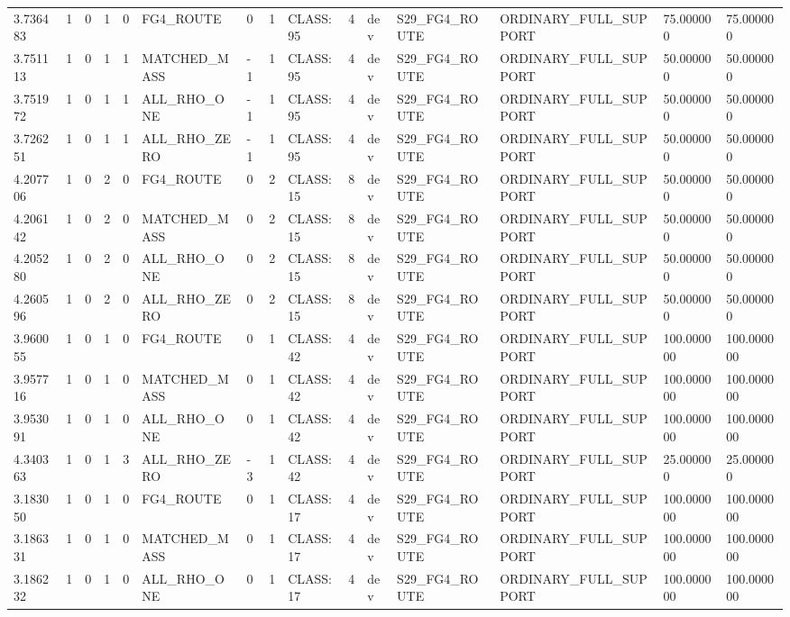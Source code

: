 \begin{tabular}{lllllllllllllll}
3.736483 & 1 & 0 & 1 & 0 & FG4\_ROUTE & 0 & 1 & CLASS:95 & 4 & dev & S29\_FG4\_ROUTE & ORDINARY\_FULL\_SUPPORT & 75.000000 & 75.000000 \\
3.751113 & 1 & 0 & 1 & 1 & MATCHED\_MASS & -1 & 1 & CLASS:95 & 4 & dev & S29\_FG4\_ROUTE & ORDINARY\_FULL\_SUPPORT & 50.000000 & 50.000000 \\
3.751972 & 1 & 0 & 1 & 1 & ALL\_RHO\_ONE & -1 & 1 & CLASS:95 & 4 & dev & S29\_FG4\_ROUTE & ORDINARY\_FULL\_SUPPORT & 50.000000 & 50.000000 \\
3.726251 & 1 & 0 & 1 & 1 & ALL\_RHO\_ZERO & -1 & 1 & CLASS:95 & 4 & dev & S29\_FG4\_ROUTE & ORDINARY\_FULL\_SUPPORT & 50.000000 & 50.000000 \\
4.207706 & 1 & 0 & 2 & 0 & FG4\_ROUTE & 0 & 2 & CLASS:15 & 8 & dev & S29\_FG4\_ROUTE & ORDINARY\_FULL\_SUPPORT & 50.000000 & 50.000000 \\
4.206142 & 1 & 0 & 2 & 0 & MATCHED\_MASS & 0 & 2 & CLASS:15 & 8 & dev & S29\_FG4\_ROUTE & ORDINARY\_FULL\_SUPPORT & 50.000000 & 50.000000 \\
4.205280 & 1 & 0 & 2 & 0 & ALL\_RHO\_ONE & 0 & 2 & CLASS:15 & 8 & dev & S29\_FG4\_ROUTE & ORDINARY\_FULL\_SUPPORT & 50.000000 & 50.000000 \\
4.260596 & 1 & 0 & 2 & 0 & ALL\_RHO\_ZERO & 0 & 2 & CLASS:15 & 8 & dev & S29\_FG4\_ROUTE & ORDINARY\_FULL\_SUPPORT & 50.000000 & 50.000000 \\
3.960055 & 1 & 0 & 1 & 0 & FG4\_ROUTE & 0 & 1 & CLASS:42 & 4 & dev & S29\_FG4\_ROUTE & ORDINARY\_FULL\_SUPPORT & 100.000000 & 100.000000 \\
3.957716 & 1 & 0 & 1 & 0 & MATCHED\_MASS & 0 & 1 & CLASS:42 & 4 & dev & S29\_FG4\_ROUTE & ORDINARY\_FULL\_SUPPORT & 100.000000 & 100.000000 \\
3.953091 & 1 & 0 & 1 & 0 & ALL\_RHO\_ONE & 0 & 1 & CLASS:42 & 4 & dev & S29\_FG4\_ROUTE & ORDINARY\_FULL\_SUPPORT & 100.000000 & 100.000000 \\
4.340363 & 1 & 0 & 1 & 3 & ALL\_RHO\_ZERO & -3 & 1 & CLASS:42 & 4 & dev & S29\_FG4\_ROUTE & ORDINARY\_FULL\_SUPPORT & 25.000000 & 25.000000 \\
3.183050 & 1 & 0 & 1 & 0 & FG4\_ROUTE & 0 & 1 & CLASS:17 & 4 & dev & S29\_FG4\_ROUTE & ORDINARY\_FULL\_SUPPORT & 100.000000 & 100.000000 \\
3.186331 & 1 & 0 & 1 & 0 & MATCHED\_MASS & 0 & 1 & CLASS:17 & 4 & dev & S29\_FG4\_ROUTE & ORDINARY\_FULL\_SUPPORT & 100.000000 & 100.000000 \\
3.186232 & 1 & 0 & 1 & 0 & ALL\_RHO\_ONE & 0 & 1 & CLASS:17 & 4 & dev & S29\_FG4\_ROUTE & ORDINARY\_FULL\_SUPPORT & 100.000000 & 100.000000 \\

\end{tabular}
